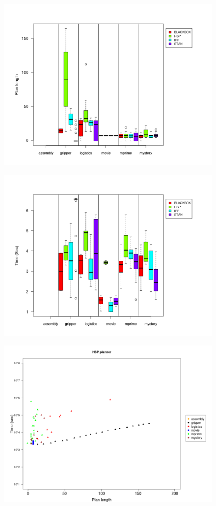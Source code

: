\documentclass[handout,t]{beamer}
\begin{document}
\begin{frame}
  \begin{figure}[ht!]
    \centering
    \includegraphics[width=0.75\linewidth]{bxplt_All_GDomain_Planner_lenght}
    \label{fig::figura3} 
  \end{figure}  
\end{frame}
\begin{frame}
  \begin{figure}[ht!]
    \centering
    \includegraphics[width=0.75\linewidth]{bxplt_All_GDomain_Planner_Time}
    \label{fig::figura4} 
  \end{figure}    
\end{frame}

\begin{frame}
  \begin{figure}[ht!]
    \centering
    \includegraphics[width=0.75\linewidth]{bxplt_HSP_Time_length}
    \label{fig::figura5} 
  \end{figure}      
\end{frame}
\end{document}
